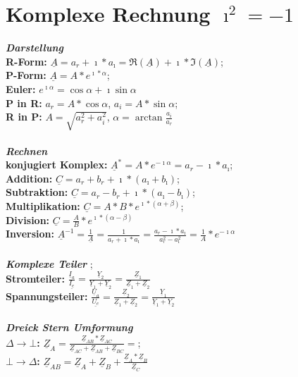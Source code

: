 \documentclass[10pt,a5paper]{article}
\begin{document}
  
 
 \newpage
 \section{Komplexe Rechnung $\imath^2=-1$}
  \textbf{\emph{Darstellung}}\\ \textbf{R-Form:} $\underline{A}=a_r+\imath*a_\imath=\Re(\underline{A})+\imath*\Im(\underline{A})$; 
  \\\textbf{P-Form:} $\underline{A}=A*e^{\imath*\alpha}$; 
  \\\textbf{Euler:} $e^{\imath\alpha}=\cos\alpha+\imath\sin\alpha$
  \\ \textbf{P in R:} $a_r=A*\cos\alpha$, $a_i=A*\sin\alpha$; 
  \\\textbf{R in P:} $A=\sqrt{a_r^2+a_i^2}$, $\alpha=\arctan\frac{a_i}{a_r}$ 
  \\\\\textbf{\emph{Rechnen}}
  \\ \textbf{konjugiert Komplex:} $\underline{A}^*=A*e^{-\imath\alpha}=a_r-\imath*a_\imath$; 
  \\\textbf{Addition:} $\underline{C}=a_r+b_r+\imath*(a_\imath+b_\imath)$; 
  \\\textbf{Subtraktion:} $\underline{C}=a_r-b_r+\imath*(a_\imath-b_\imath)$; 
  \\\textbf{Multiplikation:} $\underline{C}=A*B*e^{\imath*(\alpha+\beta)}$; 
  \\\textbf{Division:} $\underline{C}=\frac{A}{B}*e^{\imath*(\alpha-\beta)}$ 
  \\\textbf{Inversion:} $\underline{A}^{-1}=\frac{1}{\underline{A}}=\frac{1}{a_r+\imath*a_\imath}=\frac{a_r-\imath*a_\imath}{a_r^2-a_\imath^2}=\frac{1}{A}*e^{-\imath\alpha}$
  \\\\ \textbf{\emph{Komplexe Teiler }} %
;
 \\ \textbf{Stromteiler:} $\frac{\underline{I}_a}{\underline{I_e}}=\frac{\underline{Y}_2}{\underline{Y}_1+\underline{Y}_2}=\frac{\underline{Z}_1}{\underline{Z}_1+\underline{Z}_2}$
 \\ \textbf{Spannungsteiler:} $\frac{\underline{U}_a}{\underline{U_e}}=\frac{\underline{Z}_2}{\underline{Z}_1+\underline{Z}_2}=\frac{\underline{Y}_1}{\underline{Y}_1+\underline{Y}_2}$\\ 
  \\\textbf{\emph{Dreick Stern Umformung}} 
  \\\textbf{ $\Delta\to\bot$:} $\underline{Z}_A=\frac{\underline{Z}_{AB}*\underline{Z}_{AC}}{\underline{Z}_{AC}+\underline{Z}_{AB}+\underline{Z}_{BC}}=$; 
  \\\textbf{$\bot\to\Delta$:} $\underline{Z}_{AB}=\underline{Z}_A+\underline{Z}_B+\frac{\underline{Z}_A*\underline{Z}_B}{\underline{Z}_C}$
 
\end{document}
